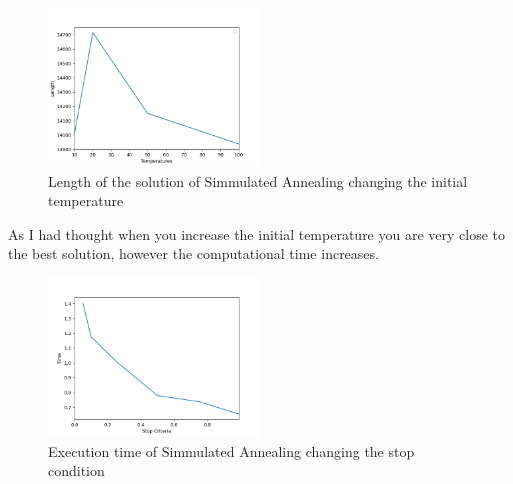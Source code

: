 \documentclass{article}
\begin{document}
            \begin{figure}[H]

                \centering
                \includegraphics[width=0.5\textwidth]{../media/03.SimAnnealing-Initial-Ta-length-75cities.png}
                \caption{Length of the solution of Simmulated Annealing changing the initial temperature}
                \label{Length of the solution of Simmulated Annealing changing the initial temperature}
    
            \end{figure}

            As I had thought when you increase the initial temperature you are very close to the best solution, however 
            the computational time increases.

            \begin{figure}[H]

                \centering
                \includegraphics[width=0.5\textwidth]{../media/03.SimAnnealing-Stop-criteria-time-75cities.png}
                \caption{Execution time of Simmulated Annealing changing the stop condition}
                \label{Execution time of Simmulated Annealing changing the stop condition}
    
            \end{figure}
\end{document}
